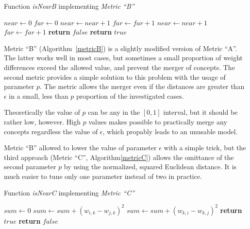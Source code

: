 \documentclass[graybox]{svmult}
\begin{document}
\begin{algorithm}
  \caption{Function \emph{isNearB} implementing \emph{Metric ``B''}}\label{metricB}
  \begin{algorithmic}[1]
      \State $near \gets 0$
      \State $far \gets 0$
            \State $near \gets near + 1$
          \Else
            \State $far \gets far + 1$
          \EndIf
            \State $near \gets near + 1$
          \Else
            \State $far \gets far + 1$
          \EndIf
        \EndIf
      \EndFor
        \State \textbf{return} $false$
      \Else
        \State \textbf{return} $true$
      \EndIf
    \EndFunction
  \end{algorithmic}
\end{algorithm}

Metric ``B'' (Algorithm~\ref{metricB}) is a slightly modified version of Metric ``A''. The latter works well in most cases, but sometimes a small proportion of weight differences exceed the allowed value, and prevent the merger of concepts. The second metric provides a simple solution to this problem with the usage of parameter $p$. The metric allows the merger even if the distances are greater than $\epsilon$ in a small, less than $p$ proportion of the investigated cases.

Theoretically the value of $p$ can be any in the $[0, 1]$ interval, but it should be rather low, however. High $p$ values makes possible to practically merge any concepts regardless the value of $\epsilon$, which propably leads to an unusable model.

Metric ``B'' allowed to lower the value of parameter $\epsilon$ with a simple trick, but the third approach (Metric ``C'', Algorithm\ref{metricC}) allows the omittance of the second parameter $p$ by using the normalized, squared Euclidean distance. It is much easier to tune only one parameter instead of two in practice.

\begin{algorithm}
  \caption{Function \emph{isNearC} implementing \emph{Metric ``C''}}\label{metricC}
  \begin{algorithmic}[1]
      \State $sum \gets 0$
          \State $sum \gets sum + (w_{i, k} - w_{j, k})^2$
          \State $sum \gets sum + (w_{k, i} - w_{k, j})^2$
        \EndIf
      \EndFor
        \State \textbf{return} $true$
      \Else
        \State \textbf{return} $false$
      \EndIf
    \EndFunction
  \end{algorithmic}
\end{algorithm}
\end{document}
